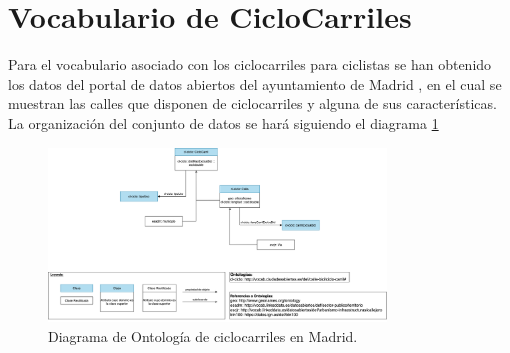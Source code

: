 \section{Vocabulario de CicloCarriles}

Para el vocabulario asociado con los ciclocarriles para ciclistas se han obtenido los datos del portal de datos abiertos del ayuntamiento de Madrid \cite{datosMadrid_ciclocarriles}, en el cual se muestran las calles que disponen de ciclocarriles y alguna de sus características.
\newline
\newline
La organización del conjunto de datos se hará siguiendo el diagrama \ref{fig:diagramaOntologCicloCarr}

\begin{figure}[h]
	\centering
		\includegraphics[angle=0, width=0.8\textwidth]{images/diagramaCicloCarril.png}  
	\caption{Diagrama de Ontología de ciclocarriles en Madrid.}
	\label{fig:diagramaOntologCicloCarr}
\end{figure}





